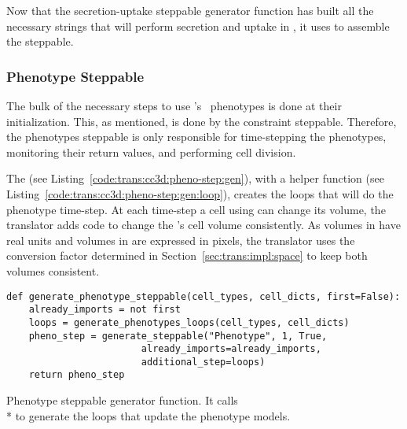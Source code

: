 
Now that the secretion-uptake steppable generator function has built all the necessary strings that will perform secretion and uptake in \ccd, it uses  to assemble the steppable.


\subsubsection{Phenotype Steppable}\label{sec:trans:gen:step:pheno}
The bulk of the necessary steps to use \pcp's~\cite{gianlupi_phenocellpy_2023} phenotypes is done at their initialization. This, as mentioned, is done by the constraint steppable. Therefore, the phenotypes steppable is only responsible for time-stepping the phenotypes, monitoring their return values, and performing cell division.

The  (see Listing~\ref{code:trans:cc3d:pheno-step:gen}), with a helper function  (see Listing~\ref{code:trans:cc3d:pheno-step:gen:loop}), creates the loops that will do the phenotype time-step. At each time-step a cell using \pcps can change its volume, the translator adds code to change the \ccd's cell volume consistently. As volumes in \pcps have real units and volumes in \ccds are expressed in pixels, the translator uses the conversion factor determined in Section~\ref{sec:trans:impl:space} to keep both volumes consistent.

\begin{listing}[H]%
\begin{verbatim}
def generate_phenotype_steppable(cell_types, cell_dicts, first=False):
    already_imports = not first
    loops = generate_phenotypes_loops(cell_types, cell_dicts)
    pheno_step = generate_steppable("Phenotype", 1, True, 
                        already_imports=already_imports, 
                        additional_step=loops)
    return pheno_step
\end{verbatim}
\caption{Phenotype steppable generator function. It calls\\* to generate the loops that update the phenotype models.}\label{code:trans:cc3d:pheno-step:gen}
\end{listing}

